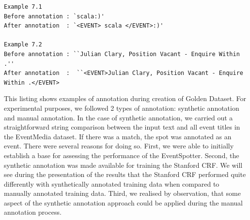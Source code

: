 \documentclass[a4paper,11pt]{report}
\begin{document}
\begin{lstlisting}
Example 7.1
Before annotation : `scala:)' 
After annotation  : `<EVENT> scala </EVENT>:)' 

Example 7.2
Before annotation : ``Julian Clary, Position Vacant - Enquire Within .'' 
After annotation  :  ``<EVENT>Julian Clary, Position Vacant - Enquire Within .</EVENT>
\end{lstlisting}
This listing shows examples of annotation during creation of Golden Dataset.\newline
\newline
For experimental purposes, we followed 2 types of annotation: synthetic annotation and manual annotation.
In the case of synthetic annotation, we carried out a straightforward string comparison between the input text and all event titles in the EventMedia dataset. If there was a match, the spot was annotated as an event. There were several reasons for doing so. First, we were able to initially establish a base for assessing the performance of the EventSpotter. Second, the synthetic annotation was made available for training the Stanford CRF. We will see during the presentation of the results that the Stanford CRF performed quite differently with synthetically annotated training data when compared to manually annotated training data. Third, we realised by observation, that some aspect of the synthetic annotation approach could be applied during the manual annotation process.
\end{document}
